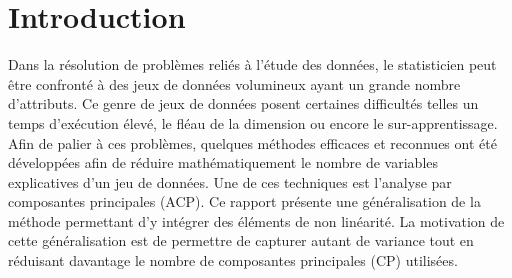 \section{Introduction}

Dans la résolution de problèmes reliés à l’étude des données, le statisticien peut être confronté à des jeux de données volumineux ayant un grande nombre d’attributs. Ce genre de jeux de données posent certaines difficultés telles un temps d'exécution élevé, le fléau de la dimension ou encore le sur-apprentissage. Afin de palier à ces problèmes, quelques méthodes efficaces et reconnues ont été développées afin de réduire mathématiquement le nombre de variables explicatives d’un jeu de données. Une de ces techniques est l’analyse par composantes principales (ACP). Ce rapport présente une généralisation de la méthode permettant d’y intégrer des éléments de non linéarité. La motivation de cette généralisation est de permettre de capturer autant de variance tout en réduisant davantage le nombre de composantes principales (CP) utilisées.
